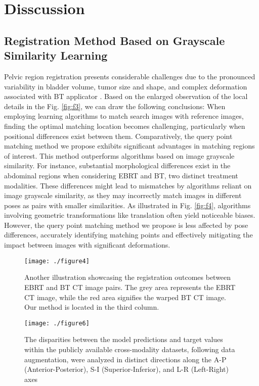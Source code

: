 \documentclass[preprint,review,12pt]{elsarticle}
\begin{document}
\section{Disscussion}

\subsection{Registration Method Based on Grayscale Similarity Learning}

Pelvic region registration presents considerable challenges due to the pronounced variability in bladder volume, tumor size and shape, and complex deformation associated with BT applicator \cite{ghose2015review}. 
Based on the enlarged observation of the local details in the Fig. \ref{fig:f3}, we can draw the following conclusions: When employing learning algorithms to match search images with reference images, finding the optimal matching location becomes challenging, particularly when positional differences exist between them. Comparatively, the query point matching method we propose exhibits significant advantages in matching regions of interest. This method outperforms algorithms based on image grayscale similarity. For instance, substantial morphological differences exist in the abdominal regions when considering EBRT and BT, two distinct treatment modalities. These differences might lead to mismatches by algorithms reliant on image grayscale similarity, as they may incorrectly match images in different poses as pairs with smaller similarities. As illustrated in Fig. \ref{fig:f4}, algorithms involving geometric transformations like translation often yield noticeable biases. However, the query point matching method we propose is less affected by pose differences, accurately identifying matching points and effectively mitigating the impact between images with significant deformations.

\begin{figure*}[htb]
	\centering
	\texttt{[image: ./figure4]}
	\caption{Another illustration showcasing the registration outcomes between EBRT and BT CT image pairs. The grey area represents the EBRT CT image, while the red area signifies the warped BT CT image. Our method is located in the third column.}
	\label{fig:f5}
\end{figure*}

\begin{figure*}[htb]
	\centering
	\texttt{[image: ./figure6]}
	\caption{The disparities between the model predictions and target values within the publicly available cross-modality datasets, following data augmentation, were analyzed in distinct directions along the A-P (Anterior-Posterior), S-I (Superior-Inferior), and L-R (Left-Right) axes}
	\label{fig:f6}
\end{figure*}
\end{document}
